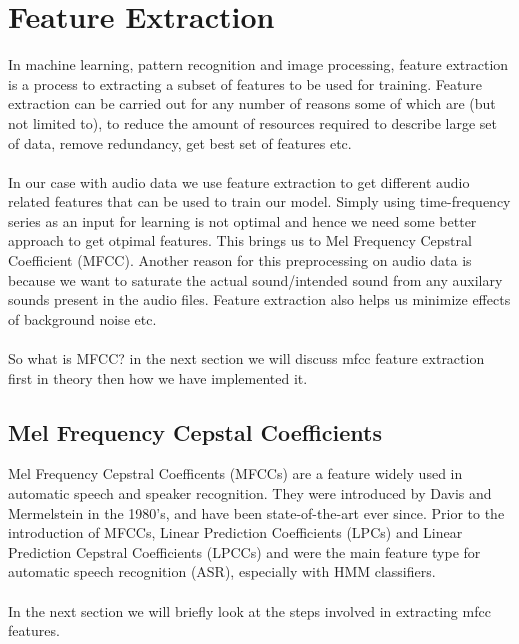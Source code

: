 \documentclass{article} %
\begin{document}
\section{Feature Extraction}
    In machine learning, pattern recognition and image processing, feature extraction is a process to extracting a subset of features to be used for training. Feature extraction can be carried out for any number of reasons some of which are (but not limited to), to reduce the amount of resources required to describe large set of data, remove redundancy, get best set of features etc.\\\\
    In our case with audio data we use feature extraction to get different audio related features that can be used to train our model. Simply using time-frequency series as an input for learning is not optimal and hence we need some better approach to get otpimal features. This brings us to Mel Frequency Cepstral Coefficient (MFCC). Another reason for this preprocessing on audio data is because we want to saturate the actual sound/intended sound from any auxilary sounds present in the audio files. Feature extraction also helps us minimize effects of background noise etc.\\\\
    So what is MFCC? in the next section we will discuss mfcc feature extraction first in theory then how we have implemented it.
	\subsection{Mel Frequency Cepstal Coefficients}
		Mel Frequency Cepstral Coefficents (MFCCs) are a feature widely used in automatic speech and speaker recognition. They were introduced by Davis and Mermelstein in the 1980's, and have been state-of-the-art ever since. Prior to the introduction of MFCCs, Linear Prediction Coefficients (LPCs) and Linear Prediction Cepstral Coefficients (LPCCs) and were the main feature type for automatic speech recognition (ASR), especially with HMM classifiers.\\\\
		In the next section we will briefly look at the steps involved in extracting mfcc features.
\end{document}
